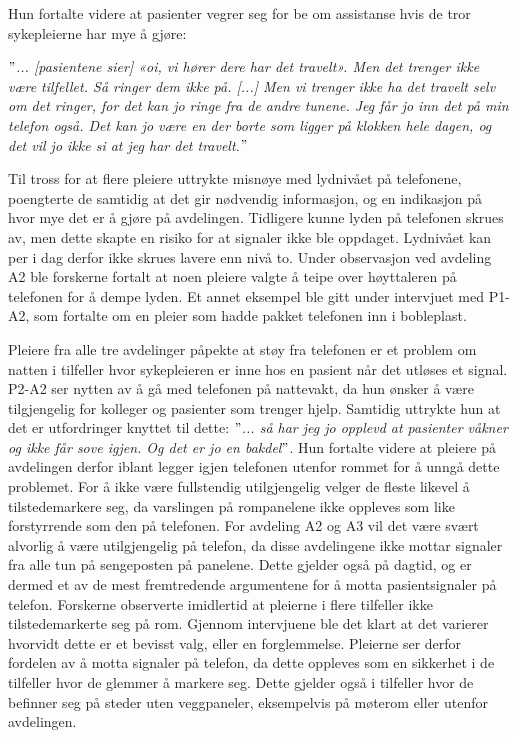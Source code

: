 \noindent
Hun fortalte videre at pasienter vegrer seg for be om assistanse hvis de tror sykepleierne har mye å gjøre:

\noindent
\textit{$"$... [pasientene sier] «oi, vi hører dere har det travelt». Men det trenger ikke være tilfellet. Så ringer dem ikke på. [...] Men vi trenger ikke ha det travelt selv om det ringer, for det kan jo ringe fra de andre tunene. Jeg får jo inn det på min telefon også. Det kan jo være en der borte som ligger på klokken hele dagen, og det vil jo ikke si at jeg har det travelt.$"$}

\noindent
Til tross for at flere pleiere uttrykte misnøye med lydnivået på telefonene, poengterte de samtidig at det gir nødvendig informasjon, og en indikasjon på hvor mye det er å gjøre på avdelingen. Tidligere kunne lyden på telefonen skrues av, men dette skapte en risiko for at signaler ikke ble oppdaget. Lydnivået kan per i dag derfor ikke skrues lavere enn nivå to. Under observasjon ved avdeling A2 ble forskerne fortalt at noen pleiere valgte å teipe over høyttaleren på telefonen for å dempe lyden. Et annet eksempel ble gitt under intervjuet med P1-A2, som fortalte om en pleier som hadde pakket telefonen inn i bobleplast.

\noindent
Pleiere fra alle tre avdelinger påpekte at støy fra telefonen er et problem om natten i tilfeller hvor sykepleieren er inne hos en pasient når det utløses et signal. P2-A2 ser nytten av å gå med telefonen på nattevakt, da hun ønsker å være tilgjengelig for kolleger og pasienter som trenger hjelp. Samtidig uttrykte hun at det er utfordringer knyttet til dette: \textit{ $"$... så har jeg jo opplevd at pasienter våkner og ikke får sove igjen. Og det er jo en bakdel$"$}. Hun fortalte videre at pleiere på avdelingen derfor iblant legger igjen telefonen utenfor rommet for å unngå dette problemet. For å ikke være fullstendig utilgjengelig velger de fleste likevel å tilstedemarkere seg, da varslingen på rompanelene ikke oppleves som like forstyrrende som den på telefonen. For avdeling A2 og A3 vil det være svært alvorlig å være utilgjengelig på telefon, da disse avdelingene ikke mottar signaler fra alle tun på sengeposten på panelene. Dette gjelder også på dagtid, og er dermed et av de mest fremtredende argumentene for å motta pasientsignaler på telefon. Forskerne observerte imidlertid at pleierne i flere tilfeller ikke tilstedemarkerte seg på rom. Gjennom intervjuene ble det klart at det varierer hvorvidt dette er et bevisst valg, eller en forglemmelse. Pleierne ser derfor fordelen av å motta signaler på telefon, da dette oppleves som en sikkerhet i de tilfeller hvor de glemmer å markere seg. Dette gjelder også i tilfeller hvor de befinner seg på steder uten veggpaneler, eksempelvis på møterom eller utenfor avdelingen.


